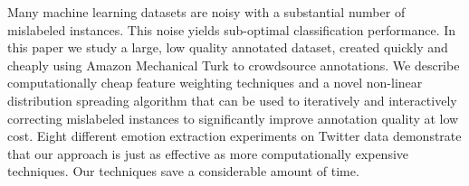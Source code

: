 Many machine learning datasets are noisy with a substantial number of mislabeled instances. This noise yields sub-optimal classification performance. In this paper we study a large, low quality annotated dataset, created quickly and cheaply using Amazon Mechanical Turk to crowdsource annotations. We describe computationally cheap feature weighting techniques and a novel non-linear distribution spreading algorithm that can be used to iteratively and interactively correcting mislabeled instances to significantly improve annotation quality at low cost. Eight different emotion extraction experiments on Twitter data demonstrate that our approach is just as effective as more computationally expensive techniques. Our techniques save a considerable amount of time.

